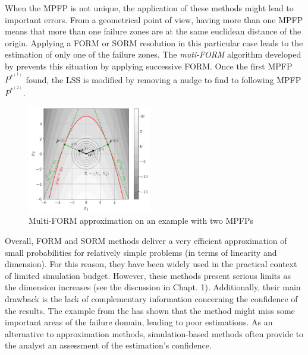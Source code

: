 When the MPFP is not unique, the application of these methods might lead to important errors.
From a geometrical point of view, having more than one MPFP means that more than one failure zones are at the same euclidean distance of the origin.
Applying a FORM or SORM resolution in this particular case leads to the estimation of only one of the failure zones.
The \textit{muti-FORM} algorithm developed by  prevents this situation by applying successive FORM. 
Once the first MPFP $P^{*^{(1)}}$ found, the LSS is modified by removing a nudge to find to following MPFP $P^{*^{(2)}}$. 

\begin{figure}[ht]
    \centering
    \includegraphics[width=0.48\textwidth]{../numerical_experiments/chapter1/figures/reliability_multiform.png}
    \caption{Multi-FORM approximation on an example with two MPFPs}
    \label{fig:multi_FORM}
\end{figure}


Overall, FORM and SORM methods deliver a very efficient approximation of small probabilities for relatively simple problems (in terms of linearity and dimension). 
For this reason, they have been widely used in the practical context of limited simulation budget. 
However, these methods present serious limits as the dimension increases (see the discussion in  Chapt. 1). 
Additionally, their main drawback is the lack of complementary information concerning the confidence of the results. 
The example from the  has shown that the method might miss some important areas of the failure domain, leading to poor estimations. 
As an alternative to approximation methods, simulation-based methods often provide to the analyst an assessment of the estimation's confidence. 




